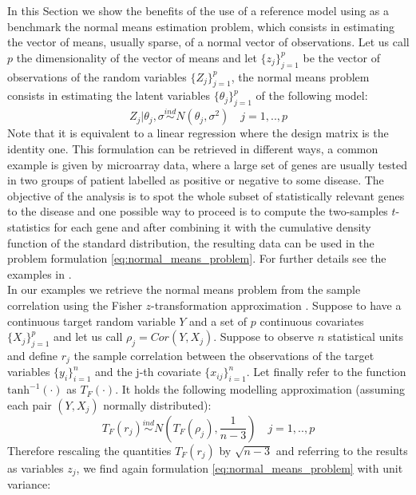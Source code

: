 \documentclass[american,]{article}
\theoremstyle{definition}
\begin{document}
In this Section we show the benefits of the use of a reference model using as a benchmark the normal means estimation problem, which consists in estimating the vector of means, usually sparse, of a normal vector of observations. Let us call $p$ the dimensionality of the vector of means and let $\{z_{j}\}_{j=1}^{p}$ be the vector of observations of the random variables $\{Z_{j}\}_{j=1}^{p}$, the normal means problem consists in estimating the latent variables $\{\theta_{j}\}_{j=1}^{p}$ of the following model:
\
\begin{equation}\label{eq:normal_means_problem}
Z_{j}|\theta_{j},\sigma\overset{ind}{\sim}N(\theta_{j},\sigma^{2}) \quad j=1,..,p
\end{equation}
Note that it is equivalent to a linear regression where the design matrix is the identity one. This formulation can be retrieved in different ways, a common example is given by microarray data, where a large set of genes are usually tested in two groups of patient labelled as positive or negative to some disease. The objective of the analysis is to spot the whole subset of statistically relevant genes to the disease and one possible way to proceed is to compute the two-samples $t$-statistics for each gene and after combining it with the cumulative density function of the standard distribution, the resulting data can be used in the problem formulation \eqref{eq:normal_means_problem}. For further details see the examples in \cite{paper:efron, efron2012large}. 
\\
In our examples we retrieve the normal means problem from the sample correlation using the Fisher $z$-transformation approximation \citep{hawkins1989using}. Suppose to have a continuous target random variable $Y$ and a set of $p$ continuous covariates $\{X_{j}\}_{j=1}^{p}$ and let us call $\rho_{j}=Cor(Y,X_{j})$. Suppose to observe $n$ statistical units and define $r_{j}$ the sample correlation between the observations of the target variables $\{y_{i}\}_{i=1}^{n}$ and the j-th covariate $\{x_{ij}\}_{i=1}^{n}$. Let finally refer to the function $\text{tanh}^{-1}(\cdot)$ as $T_{F}(\cdot)$. It holds the following modelling approximation (assuming each pair $(Y,X_{j})$ normally distributed):
\
\begin{equation} \label{eq:fisher_transformation}
T_{F}(r_{j})\overset{ind}{\sim} N(T_{F}(\rho_{j}),\frac{1}{n-3}) \quad j=1,..,p
\end{equation}
Therefore rescaling the quantities $T_{F}(r_{j})$ by $\sqrt{n-3}$ and referring to the results as variables $z_{j}$, we find again formulation \eqref{eq:normal_means_problem} with unit variance:
\end{document}
